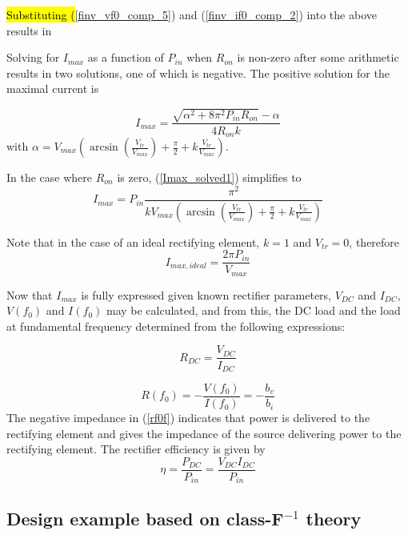 \documentclass[journal]{IEEEtran}
\begin{document}
\hl{Substituting (}\ref{finv_vf0_comp_5}) and (\ref{finv_if0_comp_2}) into the above results in

Solving for $I_{max}$ as a function of $P_{in}$ when $R_{on}$ is non-zero after some arithmetic results in two solutions, one of which is negative. The positive solution for the maximal current is

\begin{equation}\label{Imax_solved1}
    I_{max} = \frac{ \sqrt{\alpha^2 + 8\pi^2P_{in}R_{on}}-\alpha}{4R_{on}k}
\end{equation}
with $\alpha=V_{max}\left(\arcsin\left(\frac{V_{tr}}{V_{max}}\right)+ \frac{\pi}{2} + k\frac{V_{tr}}{V_{max}}\right)$.

In the case where $R_{on}$ is zero, (\ref{Imax_solved1}) simplifies to
\begin{equation}\label{Imax_solve_zeroron_solved}
    I_{max} = P_{in}\frac{\pi^2}{kV_{max}\left(\arcsin\left(\frac{V_{tr}}{V_{max}}\right)+ \frac{\pi}{2} + k\frac{V_{tr}}{V_{max}}\right)}
\end{equation}

Note that in the case of an ideal rectifying element, $k = 1$ and $V_{tr} = 0$, therefore
\begin{equation}\label{Imax_solve_zeroron_solved_ideal}
    I_{max,ideal} = \frac{2\pi P_{in}}{V_{max}}
\end{equation}

Now that $I_{max}$ is fully expressed given known rectifier parameters, $V_{DC}$ and $I_{DC}$, $V(f_0)$ and $I(f_0)$ may be calculated, and from this, the DC load and the load at fundamental frequency determined from the following expressions:

\begin{equation}\label{rdcf}
    R_{DC} = \frac{V_{DC}}{I_{DC}}
\end{equation}

\begin{equation}\label{rf0f}
    R(f_0) = -\frac{V(f_0)}{I(f_0)} = -\frac{b_v}{b_i}
\end{equation}
The negative impedance in (\ref{rf0f}) indicates that power is delivered to the rectifying element and gives the impedance of the source delivering power to the rectifying element.  The rectifier efficiency is given by
\begin{equation}\label{efff}
    \eta = \frac{P_{DC}}{P_{in}} = \frac{V_{DC}I_{DC}}{P_{in}}
\end{equation}

\subsection {Design example based on class-F$^{-1}$ theory}
\end{document}
